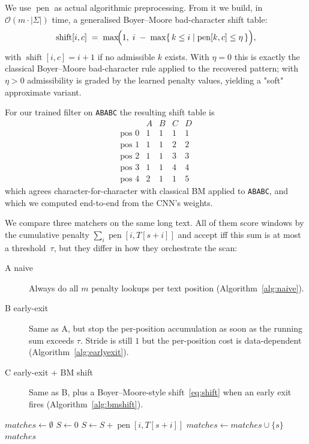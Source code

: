 \documentclass[11pt,a4paper]{article}
\newcommand{\pen}{\operatorname{pen}}
\newcommand{\sigmaalph}{\Sigma}
\newcommand{\bigO}[1]{\mathcal{O}(#1)}
\begin{document}
We use $\pen$ as actual algorithmic preprocessing. From it we build, in
$\bigO{m \cdot |\sigmaalph|}$ time, a generalised Boyer--Moore
bad-character shift table:
\begin{equation}
\operatorname{shift}[i, c] \;=\; \max\!\Bigl(1,\; i \;-\; \max\{\,k \le i \mid \pen[k, c] \le \eta\,\}\Bigr),
\label{eq:shift}
\end{equation}
with $\operatorname{shift}[i, c] = i + 1$ if no admissible $k$ exists.
With $\eta = 0$ this is exactly the classical Boyer--Moore
bad-character rule applied to the recovered pattern; with $\eta > 0$
admissibility is graded by the learned penalty values, yielding a
"soft" approximate variant.

For our trained filter on \texttt{ABABC} the resulting shift table is
\[
\begin{array}{l|cccc}
 & A & B & C & D \\\hline
\text{pos } 0 & 1 & 1 & 1 & 1 \\
\text{pos } 1 & 1 & 1 & 2 & 2 \\
\text{pos } 2 & 1 & 1 & 3 & 3 \\
\text{pos } 3 & 1 & 1 & 4 & 4 \\
\text{pos } 4 & 2 & 1 & 1 & 5
\end{array}
\]
which agrees character-for-character with classical BM applied to
\texttt{ABABC}, and which we computed end-to-end from the CNN's weights.

We compare three matchers on the same long text. All of them score
windows by the cumulative penalty
$\sum_{i} \pen[i, T[s+i]]$ and accept iff this sum is at most a
threshold~$\tau$, but they differ in how they orchestrate the scan:
\begin{description}
\item[A naive] Always do all $m$ penalty lookups per text position
  (Algorithm~\ref{alg:naive}).
\item[B early-exit] Same as A, but stop the per-position accumulation
  as soon as the running sum exceeds $\tau$. Stride is still $1$ but
  the per-position cost is data-dependent (Algorithm~\ref{alg:earlyexit}).
\item[C early-exit + BM shift] Same as B, plus a Boyer--Moore-style
  shift~\eqref{eq:shift} when an early exit fires
  (Algorithm~\ref{alg:bmshift}).
\end{description}

\begin{algorithm}[t]
\caption{Naive matcher (matcher A).}
\label{alg:naive}
\begin{algorithmic}[1]
\Function{NaiveScan}{$T, \pen, \tau$}
  \State $\mathit{matches} \gets \emptyset$
    \State $S \gets 0$
     
      \State $S \gets S + \pen[i, T[s+i]]$
    \EndFor
     $\mathit{matches} \gets \mathit{matches} \cup \{s\}$ \EndIf
  \EndFor
  \State \Return $\mathit{matches}$
\EndFunction
\end{algorithmic}
\end{algorithm}
\end{document}
